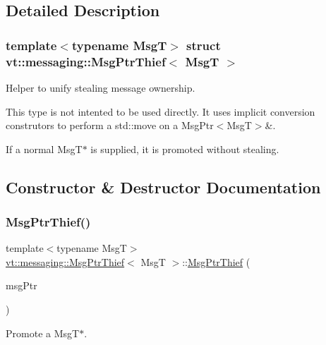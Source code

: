 \subsection{Detailed Description}
\subsubsection*{template$<$typename MsgT$>$\newline
struct vt\+::messaging\+::\+Msg\+Ptr\+Thief$<$ Msg\+T $>$}

Helper to unify \textquotesingle{}stealing\textquotesingle{} message ownership. 

This type is not intented to be used directly. It uses implicit conversion construtors to perform a \textquotesingle{}std\+::move\textquotesingle{} on a {\ttfamily Msg\+Ptr$<$\+Msg\+T$>$\&}.

If a normal {\ttfamily Msg\+T$\ast$} is supplied, it is promoted without stealing. 

\subsection{Constructor \& Destructor Documentation}
\mbox{\label{structvt_1_1messaging_1_1_msg_ptr_thief_a2055f2033d36e710bbb5247f76520d5a}} 
\subsubsection{\texorpdfstring{Msg\+Ptr\+Thief()}{MsgPtrThief()}\hspace{0.1cm}{\footnotesize\ttfamily [1/3]}}
{\footnotesize\ttfamily template$<$typename MsgT$>$ \\
\hyperlink{structvt_1_1messaging_1_1_msg_ptr_thief}{vt\+::messaging\+::\+Msg\+Ptr\+Thief}$<$ MsgT $>$\+::\hyperlink{structvt_1_1messaging_1_1_msg_ptr_thief}{Msg\+Ptr\+Thief} (\begin{DoxyParamCaption}\item[{MsgT const $\ast$}]{msg\+Ptr }\end{DoxyParamCaption})\hspace{0.3cm}{\ttfamily [inline]}}



Promote a {\ttfamily Msg\+T$\ast$}. 


